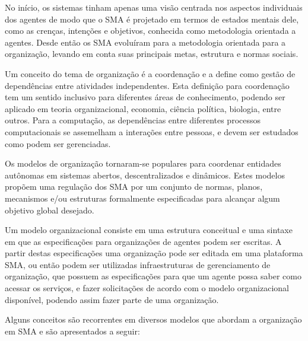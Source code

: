 No início, os sistemas tinham apenas uma visão centrada nos aspectos individuais dos agentes de modo que o SMA é projetado em termos de estados mentais dele, como as crenças, intenções e objetivos, conhecida como metodologia orientada a agentes. Desde então os SMA evoluíram para a metodologia orientada para a organização, levando em conta suas principais metas, estrutura e normas sociais\cite{argente2006multi}. 

Um conceito do tema de organização é a coordenação e \citet{malone1994interdisciplinary} a define como gestão de dependências entre atividades independentes. Esta definição para coordenação tem um sentido inclusivo para diferentes áreas de conhecimento, podendo ser aplicado em teoria organizacional, economia, ciência política, biologia, entre outros. Para a computação, as dependências entre diferentes processos computacionais se assemelham a interações entre pessoas, e devem ser estudados como podem ser gerenciadas.

Os modelos de organização tornaram-se populares para coordenar entidades autônomas em sistemas abertos, descentralizados e dinâmicos. Estes modelos propõem uma regulação dos SMA por um conjunto de normas, planos, mecanismos e/ou estruturas formalmente especificadas para alcançar algum objetivo global desejado.

Um modelo organizacional consiste em uma estrutura conceitual e uma sintaxe em que as especificações para organizações de agentes podem ser escritas. A partir destas especificações uma organização pode ser editada em uma plataforma SMA, ou então podem ser utilizadas infraestruturas de gerenciamento de organização, que possuem as especificações para que um agente possa saber como acessar os serviços, e fazer solicitações de acordo com o modelo organizacional disponível, podendo assim fazer parte de uma organização.

Alguns conceitos são recorrentes em diversos modelos que abordam a organização em SMA e são apresentados a seguir:

